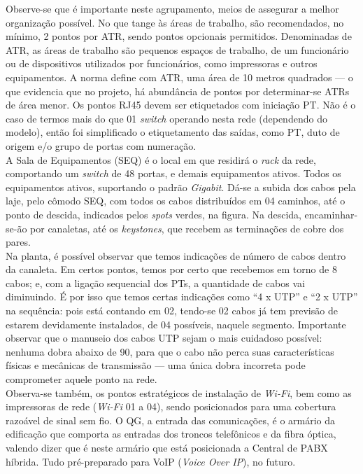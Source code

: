 \documentclass[	DIV=calc,%
							paper=a4,%
							fontsize=12pt,%
							onecolumn]{scrartcl}	 					%
\begin{document}
Observe-se que é importante neste agrupamento, meios de assegurar a melhor organização possível. No que tange às áreas de trabalho, são recomendados, no mínimo, 2 pontos por ATR, sendo pontos opcionais permitidos. Denominadas de ATR, as áreas de trabalho são pequenos espaços de trabalho, de um funcionário ou de dispositivos utilizados por funcionários, como impressoras e outros equipamentos. A norma define com ATR, uma área de 10 metros quadrados --- o que evidencia que no projeto, há abundância de pontos por determinar-se ATRs de área menor. Os pontos RJ45 devem ser etiquetados com iniciação PT. Não é o caso de termos mais do que 01 \textit{switch} operando nesta rede (dependendo do modelo), então foi simplificado o etiquetamento das saídas, como PT, duto de origem e/o grupo de portas com numeração.
\\

A Sala de Equipamentos (SEQ) é o local em que residirá o \textit{rack} da rede, comportando um \textit{switch} de 48 portas, e demais equipamentos ativos. Todos os equipamentos ativos, suportando o padrão \textit{Gigabit}. Dá-se a subida dos cabos pela laje, pelo cômodo SEQ, com todos os cabos distribuídos em 04 caminhos, até o ponto de descida, indicados pelos \textit{spots} verdes, na figura. Na descida, encaminhar-se-ão por canaletas, até os \textit{keystones}, que recebem as terminações de cobre dos pares. 
\\

Na planta, é possível observar que temos indicações de número de cabos dentro da canaleta. Em certos pontos, temos por certo que recebemos em torno de 8 cabos; e, com a ligação sequencial dos PTs, a quantidade de cabos vai diminuindo. É por isso que temos certas indicações como ``4 x UTP'' e ``2 x UTP'' na sequência: pois está contando em 02, tendo-se 02 cabos já tem previsão de estarem devidamente instalados, de 04 possíveis, naquele segmento. Importante observar que o manuseio dos cabos UTP sejam o mais cuidadoso possível: nenhuma dobra abaixo de 90, para que o cabo não perca suas características físicas e mecânicas de transmissão --- uma única dobra incorreta pode comprometer aquele ponto na rede. 
\\

Observa-se também, os pontos estratégicos de instalação de \textit{Wi-Fi}, bem como as impressoras de rede (\textit{Wi-Fi} 01 a 04), sendo posicionados para uma cobertura razoável de sinal sem fio. O QG, a entrada das comunicações, é o armário da edificação que comporta as entradas dos troncos telefônicos e da fibra óptica, valendo dizer que é neste armário que está posicionada a Central de PABX híbrida. Tudo pré-preparado para VoIP (\textit{Voice Over IP}), no futuro.
\end{document}
